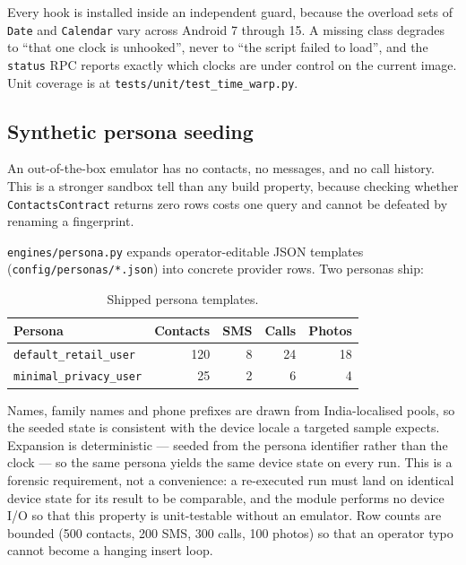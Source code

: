 \documentclass{article}
\begin{document}
Every hook is installed inside an independent guard, because the overload sets
of \texttt{Date} and \texttt{Calendar} vary across Android 7 through 15. A
missing class degrades to ``that one clock is unhooked'', never to ``the script
failed to load'', and the \texttt{status} RPC reports exactly which clocks are
under control on the current image. Unit coverage is at
\texttt{tests/unit/test\_time\_warp.py}.

\subsection{Synthetic persona seeding}
\label{ssec:persona}

An out-of-the-box emulator has no contacts, no messages, and no call history.
This is a stronger sandbox tell than any build property, because checking
whether \texttt{ContactsContract} returns zero rows costs one query and cannot
be defeated by renaming a fingerprint.

\texttt{engines/persona.py} expands operator-editable JSON templates
(\texttt{config/personas/*.json}) into concrete provider rows. Two personas ship:

\begin{table}[htb]
\centering
\caption{Shipped persona templates.}
\label{tab:persona}
\begin{tabular}{@{}lrrrr@{}}
\toprule
\textbf{Persona} & \textbf{Contacts} & \textbf{SMS} & \textbf{Calls} & \textbf{Photos} \\
\midrule
\texttt{default\_retail\_user} & 120 & 8 & 24 & 18 \\
\texttt{minimal\_privacy\_user} & 25 & 2 & 6 & 4 \\
\bottomrule
\end{tabular}
\end{table}

Names, family names and phone prefixes are drawn from India-localised pools, so
the seeded state is consistent with the device locale a targeted sample expects.
Expansion is deterministic --- seeded from the persona identifier rather than
the clock --- so the same persona yields the same device state on every run.
This is a forensic requirement, not a convenience: a re-executed run must land
on identical device state for its result to be comparable, and the module
performs no device I/O so that this property is unit-testable without an
emulator. Row counts are bounded (500 contacts, 200 SMS, 300 calls, 100 photos)
so that an operator typo cannot become a hanging insert loop.
\end{document}
